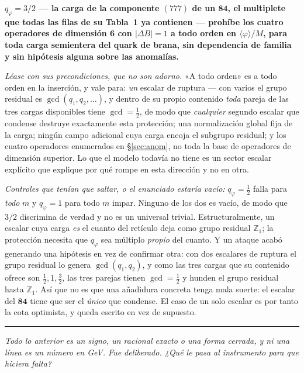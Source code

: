 \documentclass[11pt,a4paper]{article}
\newcommand{\ZZ}{\mathbb{Z}}
\newcommand{\rep}[1]{\mathbf{#1}}
\newcommand{\bridge}[1]{\par\medskip\noindent
  \textcolor{hdrblue!45}{\rule{2.2cm}{0.6pt}}\;\;\parbox[t]{0.84\textwidth}{\small\itshape
  \textcolor{hdrblue!85}{#1}}\par\medskip}
\newenvironment{keyeq}
  {\begin{center}\setlength{\fboxsep}{9pt}\setlength{\fboxrule}{0.8pt}%
   \begin{lrbox}{\keyeqbox}\begin{minipage}{0.88\textwidth}}
  {\end{minipage}\end{lrbox}%
   \fcolorbox{hdrblue!55}{hdrblue!6}{\usebox{\keyeqbox}}\end{center}}
\begin{document}
\begin{keyeq}
\textbf{$q_\varphi=3/2$ --- la carga de la componente $(777)$ de un $\rep{84}$, el multiplete que
todas las filas de su Tabla~1 ya contienen --- prohíbe los cuatro operadores de dimensión 6 con
$|\Delta B|=1$ a todo orden en $\langle\varphi\rangle/M$, para toda carga semientera del quark de
brana, sin dependencia de familia y sin hipótesis alguna sobre las anomalías.}

\smallskip
\noindent\emph{Léase con sus precondiciones, que no son adorno.} «A todo orden» es a todo orden en la
inserción, y vale para: \emph{un} escalar de ruptura --- con varios el grupo residual es
$\gcd(q_1,q_2,\dots)$, y dentro de su propio contenido \emph{toda} pareja de las tres cargas
disponibles tiene $\gcd=\tfrac12$, de modo que \emph{cualquier} segundo escalar que condense destruye
exactamente esta protección; una
normalización global fija de la carga; ningún campo adicional cuya carga encoja el subgrupo residual;
y los cuatro operadores enumerados en \S\ref{sec:anom}, no toda la base de operadores de dimensión
superior. Lo que el modelo todavía no tiene es un sector escalar explícito que explique por qué rompe
en esta dirección y no en otra.
\end{keyeq}

\emph{Controles que tenían que saltar, o el enunciado estaría vacío:} $q_\varphi=\tfrac12$ falla para
\emph{todo} $m$ y $q_\varphi=1$ para todo $m$ impar. Ninguno de los dos es vacío, de modo que $3/2$
discrimina de verdad y no es un universal trivial. Estructuralmente, un escalar cuya carga \emph{es}
el cuanto del retículo deja como grupo residual $\ZZ_1$; la protección necesita que $q_\varphi$ sea
múltiplo \emph{propio} del cuanto. Y un ataque acabó generando una hipótesis en vez de confirmar
otra: con dos escalares de ruptura el grupo residual lo genera $\gcd(q_1,q_2)$, y como las tres
cargas que su contenido ofrece son $\tfrac12,1,\tfrac32$, las tres parejas tienen $\gcd=\tfrac12$ y
hunden el grupo residual hasta $\ZZ_1$. Así que no es que una añadidura concreta tenga mala suerte:
el escalar del $\rep{84}$ tiene que ser el \emph{único} que condense. El caso de un
solo escalar es por tanto la cota optimista, y queda escrito en vez de supuesto.

\bridge{Todo lo anterior es un signo, un racional exacto o una forma cerrada, y ni una línea es un
número en GeV. Fue deliberado. ¿Qué le pasa al instrumento para que hiciera falta?}

\end{document}
